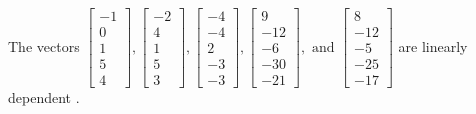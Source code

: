 \begin{exercise}
\begin{exerciseStatement}
  \end{exerciseStatement}
  \begin{exerciseAnswer}
   The vectors \(\left[\begin{array}{r}
-1 \\
0 \\
1 \\
5 \\
4
\end{array}\right] , \left[\begin{array}{r}
-2 \\
4 \\
1 \\
5 \\
3
\end{array}\right] , \left[\begin{array}{r}
-4 \\
-4 \\
2 \\
-3 \\
-3
\end{array}\right] , \left[\begin{array}{r}
9 \\
-12 \\
-6 \\
-30 \\
-21
\end{array}\right] , \text{ and } \left[\begin{array}{r}
8 \\
-12 \\
-5 \\
-25 \\
-17
\end{array}\right]\) are 
  	 linearly dependent  .
  


  \end{exerciseAnswer}
\end{exercise}